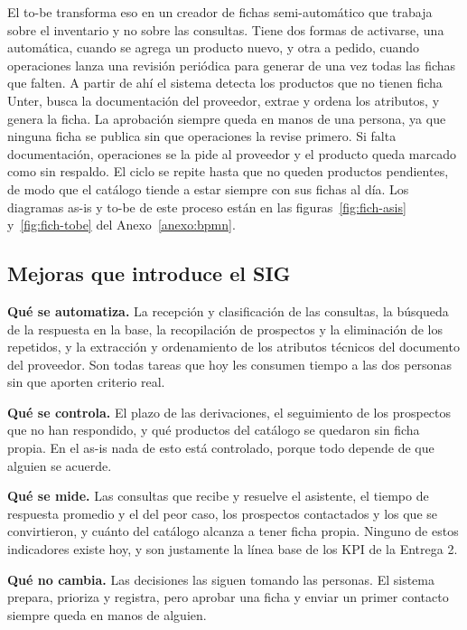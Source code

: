 \documentclass{article}
\begin{document}
El to-be transforma eso en un creador de fichas semi-automático que trabaja sobre el inventario y no sobre las consultas. Tiene dos formas de activarse, una automática, cuando se agrega un producto nuevo, y otra a pedido, cuando operaciones lanza una revisión periódica para generar de una vez todas las fichas que falten. A partir de ahí el sistema detecta los productos que no tienen ficha Unter, busca la documentación del proveedor, extrae y ordena los atributos, y genera la ficha. La aprobación siempre queda en manos de una persona, ya que ninguna ficha se publica sin que operaciones la revise primero. Si falta documentación, operaciones se la pide al proveedor y el producto queda marcado como sin respaldo. El ciclo se repite hasta que no queden productos pendientes, de modo que el catálogo tiende a estar siempre con sus fichas al día.
Los diagramas as-is y to-be de este proceso están en las figuras~\ref{fig:fich-asis} y~\ref{fig:fich-tobe} del Anexo~\ref{anexo:bpmn}.

\subsection{Mejoras que introduce el SIG}

\textbf{Qué se automatiza.} La recepción y clasificación de las consultas, la búsqueda de la respuesta en la base, la recopilación de prospectos y la eliminación de los repetidos, y la extracción y ordenamiento de los atributos técnicos del documento del proveedor. Son todas tareas que hoy les consumen tiempo a las dos personas sin que aporten criterio real.

\textbf{Qué se controla.} El plazo de las derivaciones, el seguimiento de los prospectos que no han respondido, y qué productos del catálogo se quedaron sin ficha propia. En el as-is nada de esto está controlado, porque todo depende de que alguien se acuerde.

\textbf{Qué se mide.} Las consultas que recibe y resuelve el asistente, el tiempo de respuesta promedio y el del peor caso, los prospectos contactados y los que se convirtieron, y cuánto del catálogo alcanza a tener ficha propia. Ninguno de estos indicadores existe hoy, y son justamente la línea base de los KPI de la Entrega 2.

\textbf{Qué no cambia.} Las decisiones las siguen tomando las personas. El sistema prepara, prioriza y registra, pero aprobar una ficha y enviar un primer contacto siempre queda en manos de alguien.

\end{document}
